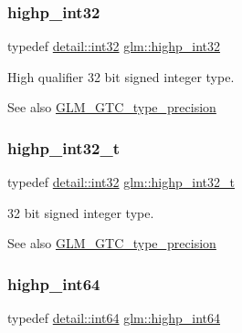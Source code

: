 \subsubsection{\texorpdfstring{highp\+\_\+int32}{highp\_int32}}
{\footnotesize\ttfamily typedef \hyperlink{namespaceglm_1_1detail_a9f85b4efeca416cdcec2fd08939a2e17}{detail\+::int32} \hyperlink{group__gtc__type__precision_gaa2045c92b9553d463191af6a20e997bb}{glm\+::highp\+\_\+int32}}

High qualifier 32 bit signed integer type. \begin{DoxySeeAlso}{See also}
\hyperlink{group__gtc__type__precision}{G\+L\+M\+\_\+\+G\+T\+C\+\_\+type\+\_\+precision} 
\end{DoxySeeAlso}
\mbox{\label{group__gtc__type__precision_ga783d077a513c1f475f6cdb406b4238c3}} 
\subsubsection{\texorpdfstring{highp\+\_\+int32\+\_\+t}{highp\_int32\_t}}
{\footnotesize\ttfamily typedef \hyperlink{namespaceglm_1_1detail_a9f85b4efeca416cdcec2fd08939a2e17}{detail\+::int32} \hyperlink{group__gtc__type__precision_ga783d077a513c1f475f6cdb406b4238c3}{glm\+::highp\+\_\+int32\+\_\+t}}

32 bit signed integer type. \begin{DoxySeeAlso}{See also}
\hyperlink{group__gtc__type__precision}{G\+L\+M\+\_\+\+G\+T\+C\+\_\+type\+\_\+precision} 
\end{DoxySeeAlso}
\mbox{\label{group__gtc__type__precision_ga7ffb27943e9569800979081bc548621c}} 
\subsubsection{\texorpdfstring{highp\+\_\+int64}{highp\_int64}}
{\footnotesize\ttfamily typedef \hyperlink{namespaceglm_1_1detail_a5b1c3227ec636c24a0676746381adfc8}{detail\+::int64} \hyperlink{group__gtc__type__precision_ga7ffb27943e9569800979081bc548621c}{glm\+::highp\+\_\+int64}}

